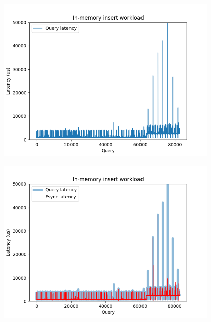 \documentclass[usenames,dvipsnames, 18pt, compress, aspectratio=169]{beamer}
\begin{document}
\begin{frame}[fragile]{}
    \frametitle{}
    \begin{center}
		\begin{overprint}[12.5cm]

        \includegraphics[width=0.8\textwidth,center]{in-memory-insert-latency.png}

        \includegraphics[width=0.8\textwidth,center]{in-memory-insert-latency-sync.png}
		\end{overprint}

    \end{center}
\end{frame}

\end{document}
